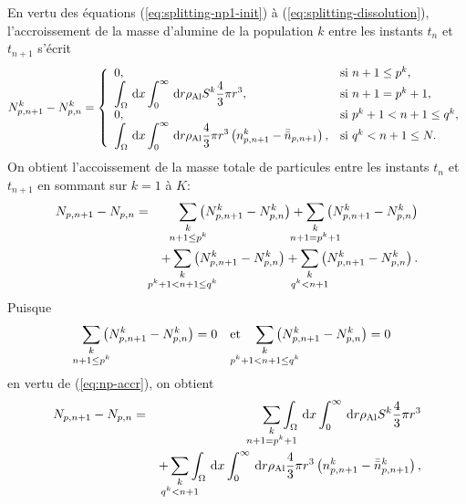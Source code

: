 En vertu des équations (\ref{eq:splitting-np1-init}) à
(\ref{eq:splitting-dissolution}), l'accroissement de la masse d'alumine
de la population $k$ entre les instants $t_{n}$ et $t_{n + 1}$ s'écrit
\begin{equation}\label{eq:np-accr}
  N_{p,n+1}^k - N_{p,n}^k = \left\{
  \begin{array}{ll}
    0, & \text{si }n+1 \leq p^k, \\
    \displaystyle\int_\Omega\,\mathrm dx\displaystyle\int_0^\infty\,\mathrm dr \rho_\mathrm{Al} S^k\frac{4}{3}\pi
    r^3, & \text{si }n+1 = p^k + 1, \\
    0, & \text{si }p^k+1 < n+1 \leq q^k, \\
    \displaystyle\int_\Omega\,\mathrm dx\displaystyle\int_0^\infty\,\mathrm dr \rho_\mathrm{Al} \frac{4}{3}\pi
    r^3\left( n_{p,n+1}^k - \bar{\bar n}_{p,n+1} \right), &\text{si } q^k < n+1 \leq N.
  \end{array}
  \right.
\end{equation}
On obtient l'accoissement de la masse totale de particules entre les
instants $t_n$ et $t_{n+1}$ en sommant sur $k = 1$ à $K$:
\begin{eqnarray*}
  N_{p,n+1} - N_{p,n}
  &=& \sum_{\mathclap{\substack{k\\ n+1 \leq p^k}}} \parent{N_{p,n+1}^k - N_{p,n}^k} %
  + \sum_{\mathclap{\substack{k\\ n+1 = p^k + 1}}} \parent{N_{p,n+1}^k - N_{p,n}^k}\\
  && + \sum_{\mathclap{\substack{k\\ p^k + 1 < n+1 \leq q^k}}} \parent{N_{p,n+1}^k - N_{p,n}^k} %
  + \sum_{\mathclap{\substack{k\\ q^k < n+1}}} \parent{N_{p,n+1}^k -
    N_{p,n}^k}.
\end{eqnarray*}
Puisque
\begin{equation*}
\sum_{\mathclap{\substack{k\\ n+1 \leq p^k}}} \parent{N_{p,n+1}^k - N_{p,n}^k} = 0 \quad \text{et}\quad \sum_{\mathclap{\substack{k\\ p^k + 1 < n+1 \leq q^k}}} \parent{N_{p,n+1}^k - N_{p,n}^k} = 0
\end{equation*}
en vertu de (\ref{eq:np-accr}), on obtient
\begin{eqnarray}
  N_{p,n+1} - N_{p,n}
  &=&\sum_{\mathclap{\substack{k\\ n+1 = p^k+1}}} \displaystyle\int_\Omega\intd{x}\displaystyle\int_0^\infty\intd{r} \aluminadensity S^k\frac{4}{3}\pi
  r^3 \nonumber\\
  && + \sum_{\mathclap{\substack{k \\ q^k < n+1}}} \displaystyle\int_\Omega\intd{x}\displaystyle\int_0^\infty \intd{r}\aluminadensity \frac{4}{3}\pi
    r^3\parent{n_{p,n+1}^k - \bar{\bar n}_{p,n+1}^k}, \label{eq:np-masse-1}
\end{eqnarray}

